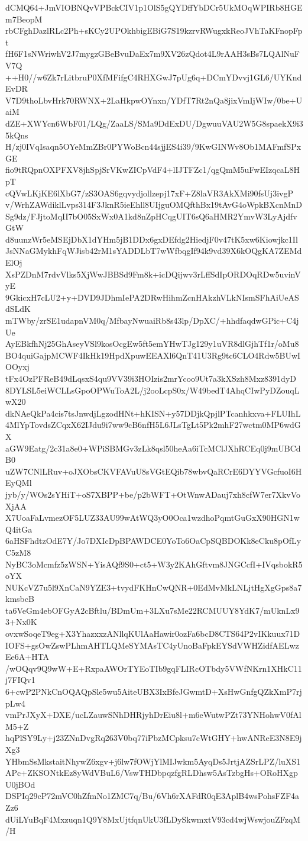 dCMQ64+JmVIOBNQvVPBckCIV1p1OlS5gQYDffYbDCr5UkMOqWPIRb8HGEm7BeopM
rbCFghDazlRLc2Ph+sKCy2UPOkhbigEBiG7S19kzrvRWugxkReoJVhTaKFnopFpt
fH6F1sNWriwhV2J7mygzGBeBvuDaEx7m9XV26zQdot4L9rAAH3sBs7LQAlNuFV7Q
++H0//w6Zk7rLitbruP0XfMFifgC4RHXGwJ7pUg6q+DCmYDvvj1GL6/UYKndEvDR
V7D9thoLbvHrk70RWNX+2LaHkpwOYnxn/YDfT7Rt2nQa8jixVmIjWIw/0be+UaiM
dZE+XWYcn6WbF01/LQg/ZaaLS/SMa9DdExDU/DgwuuVAU2W5G8spaekX9i35kQns
H/zj0IVqIsaqn5OYeMmZBr0PYWoBcn44sjjES4i39/9KwGINWv8Ob1MAFmfSPxGE
fio9tRQpnOXPFXV8jhSpjSrVKwZICpVdF4+lIJTFZc1/qgQmM5uFwEIzqcaL8HpT
cQVwLKjKE6lXbG7/zS3OAS6gqvydjollzepj17xF+Z8laVR3AkXMi90fsUj3ivgP
v/WrhZAWdiklLvps314F3JknR5ieEhll8UIjguOMQfthBx19tAvG4oWpkBXcnMnD
Sg9dz/FJjtoMqII7bO05SxWx0A1kd8nZpHCqgUIT6sQ6aHMR2YmvW3LyAjdfvGtW
d8uunzWr5eMSEjDbX1dYHm5jB1DDx6gxDEfdg2HiedjF0v47tK5xw6Kiowjkc1Il
JsNNaGMykhFqWJisb42rM1sYADDLbT7wWfbqgIf94k9vd39X6kOQgKA7ZEMdElOj
XsPZDnM7rdvVlks5XjWwJBBSd9Fm8k+icDQijwv3rLffSdIpORDOqRDw5uvinVyE
9GkicxH7cLU2+y+DVD9JDhmIePA2DRwHihmZcnHAkzhVLkNIsmSFhAiUeASdSLdK
mTWby/zrSE1udapnVM0q/MfbayNwuaiRb8s43lp/DpXC/+hhdfaqdwGPic+C4jUe
AyEBkfhNj25GhAseyVSl9kosOcgEw5ft5emYHwTJg129y1uVR8dlGjhTf1r/oMu8
BO4quiGajpMCWF4IkHk19HpdXpuwEEAXl6QnT41U3Rg9tc6CLO4Rdw5BUwIOOyxj
tFx4OzPFReB49dLqsxS4qu9VV39i3HOIzis2mrYcoo9Ut7a3kXSzh8Mxz8391dyD
8DYLSL5eiWCLLsGpoOPWuToA2L/j2ooLcpS0x/W49bedT4AhqCIwPyDZouqLwX20
dkNAeQkPa4cis7tsJnwdjLgzodHNt+hKISN+y57DDjkQpjlPTcanhkxva+FLUIhL
4MlYpTovdsZCqxX62IJdu9i7ww9cB6nfH5L6JLsTgLt5Pk2mhF27wctm0MP6wdGX
aGW9Eatg/2c31a8e0+WPiSBMGv3zLk8qsl50heAa6iTcMClJXhRCEq0j9mUBCdB0
uZW7CNlLRuv+oJXObsCKVFAVuU8sVGtEQib78wbvQaRCrE6DYYVGcfuoI6HEyQMl
jyb/y/WOs2sYHiT+oS7XBPP+be/p2bWFT+OtWnwADauj7xh8cfW7er7XkvVoXjAA
X7UoaFaLvmezOF5LUZ33AU99wAtWQ3yO0Oca1wzdhoPqmtGuGxX90HGN1wQ4itGa
6aHSFhdtzOdE7Y/Jo7DXIcDpBPAWDCE0YoTo6OaCpSQBDOKk8eCku8pOfLyC5zM8
NyBC3oMcmfz5zWSN+YisAQf9S0+ct5+W3y2KAhGftvm8JNGCcfI+IVqsbokR5oYX
NUKcVZ7u5l9XnCaN9YZE3+tvydFKHnCwQNR+0EdMvMkLNLjtHgXgGps8a7kmsbcB
ta6VeGm4ebOFGyA2cBftlu/BDmUm+3LXu7sMe22RCMUUY8YdK7/mUknLx93+Nx0K
ovxwSoqeT9eg+X3YhazxxzANllqKUlAaHawir0ozFa6bcD8CTS64P2vIKkuux71D
IOFS+gsOwZswPLhmAHTLQMeSYMAsTC4yUnoBaFpkEYSdVWHZidfAELwzEe6A+HTA
/wOQqv9Q9wW+E+RxpaAWOrTYEoTIb9gqFLIRcOTbdy5VWfNKrn1XHkC11j7FIQv1
6+cwP2PNkCnOQAQpSle5wu5AiteUBX3IxBfeJGwmtD+XsHwGnfgQZkXmP7rjpLw4
vmPrJXyX+DXE/ucLZauwSNhDHRjyhDrEiu8l+m6eWutwPZt73YNHohwV0fAlM5+Z
hqPlSY9Ly+j23ZNnDvgRq263V0bq77iPbzMCpksu7cWtGHY+hwANReE3N8E9jXg3
YHbmSsMkstaitNhywZ6xgv+j6lw7fOWjYlMIJwkm5AyqDs5JrtjAZSrLPZ/luXS1
APc+ZKSONtkEz8yWdVBuL6/VswTHDbpqzfgRLDhsw5AsTzbgHs+ORoHXgpU0jBOd
DSPIq29cP72mVC0hZfmNo1ZMC7q/Bu/6Vh6rXAFdR0qE3AplB4wsPohsFZF4aZz6
dUiLYuBqF4Mxzuqn1Q9Y8MxUjtfqnUkU3fLDySkwmxtV93cd4wjWswjouZFzqM/H

